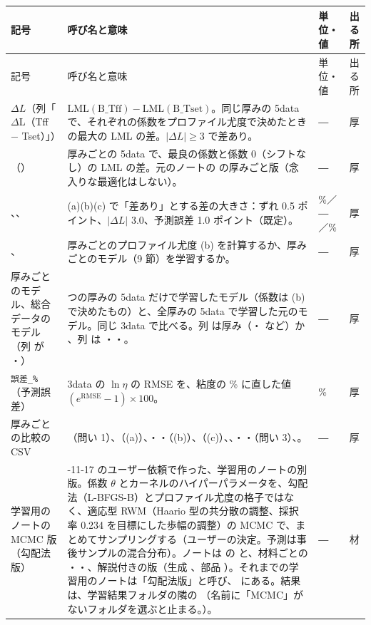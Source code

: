 \documentclass[paper=a4paper,fontsize=10.5pt,line_length=44zw,number_of_lines=38]{jlreq}
\makeatletter
\newcommand{\file}[1]{\texttt{\detokenize{#1}}}
\newenvironment{symtab}{%
  \begin{longtable}{@{}>{\raggedright\arraybackslash}p{6.5\zw}>{\raggedright\arraybackslash}p{22\zw}>{\raggedright\arraybackslash}p{6\zw}>{\raggedright\arraybackslash}p{4.5\zw}@{}}
  \toprule 記号 & 呼び名と意味 & 単位・値 & 出る所 \\ \midrule \endfirsthead
  \toprule 記号 & 呼び名と意味 & 単位・値 & 出る所 \\ \midrule \endhead
  \bottomrule \endlastfoot}{\end{longtable}}
\makeatother
\begin{document}
\begin{symtab}
$\Delta L$（列「$\Delta$L（Tff − Tset）」） & $\mathrm{LML}(\text{B\_Tff})-\mathrm{LML}(\text{B\_Tset})$。同じ厚みの 5data で、それぞれの係数をプロファイル尤度で決めたときの最大の LML の差。$|\Delta L|\ge3$ で差あり。 & ― & 厚 \\
\file{係数0との差}（\file{プロファイル尤度_厚みごと.csv}） & 厚みごとの 5data で、最良の係数と係数 0（シフトなし）の LML の差。元のノートの \file{dLML_vs_0} の厚みごと版（念入りな最適化はしない）。 & ― & 厚 \\
\file{A_CLEAR}、\file{DL_CLEAR}、\file{ERR_CLEAR} & (a)(b)(c) で「差あり」とする差の大きさ：ずれ 0.5 ポイント、$|\Delta L|$ 3.0、予測誤差 1.0 ポイント（既定）。 & \%／―／\% & 厚 \\
\file{THICK_PROFILE}、\file{THICK_MODELS} & 厚みごとのプロファイル尤度 (b) を計算するか、厚みごとのモデル（9 節）を学習するか。 & ― & 厚 \\
厚みごとのモデル、総合データのモデル（列 \file{学習} が \file{厚みごと}・\file{総合}） & 1 つの厚みの 5data だけで学習したモデル（係数は (b) で決めたもの）と、全厚みの 5data で学習した元のモデル。同じ 3data で比べる。列 \file{厚みの名前} は厚み（\file{0.5}・\file{1} など）か \file{全厚み}、列 \file{範囲} は \file{全体}・\file{低速側}・\file{高速側}。 & ― & 厚 \\
\texttt{誤差\_\%}（予測誤差） & 3data の $\ln\eta$ の RMSE を、粘度の \% に直した値 $(e^{\mathrm{RMSE}}-1)\times100$。 & \% & 厚 \\
厚みごとの比較の CSV & \file{温度シフトの確認_厚みごと.csv}（問い 1）、\file{重ね合わせ_厚みごと.csv}（(a)）、\file{プロファイル尤度_厚みごと.csv}・\file{…_格子_厚みごと.csv}・\file{対数周辺尤度の差_厚みごと.csv}（(b)）、\file{検証誤差_厚みごと.csv}（(c)）、\file{厚みごとの比較_まとめ.csv}、\file{厚みごとと総合の比較.csv}・\file{…_まとめ.csv}・\file{厚みごとのモデル_予測値.csv}（問い 3）、\file{判定の一覧.csv}。 & ― & 厚 \\
学習用のノートの MCMC 版（勾配法版） & 2026-11-17 のユーザー依頼で作った、学習用のノートの別版。係数 $\theta$ とカーネルのハイパーパラメータを、勾配法（L-BFGS-B）とプロファイル尤度の格子ではなく、適応型 RWM（Haario 型の共分散の調整、採択率 0.234 を目標にした歩幅の調整）の MCMC で、まとめてサンプリングする（ユーザーの決定。予測は事後サンプルの混合分布）。ノートは \file{02_材料別_温度シフト機械学習コード/02_MCMC(適応型RWM)/} の \file{材料別_温度シフトGPR_MCMC_ARD対応Matern52＋線形＋ホワイトノイズ.ipynb} と、材料ごとの \file{PP_}・\file{MIXPP_}・\file{GPPS_…}、解説付きの版（生成 \file{build_mat_shift_mcmc_nb.py}、部品 \file{mat_mcmc.py}）。それまでの学習用のノートは「勾配法版」と呼び、\file{01_勾配法（L-BFGS-B）/} にある。結果は、学習結果フォルダの隣の \file{<N回目>_<材料フォルダ>_学習結果_MCMC/}（名前に「MCMC」がないフォルダを選ぶと止まる。\file{REQUIRE_MCMC_FOLDER}）。 & ― & 材 \\

\end{symtab}
\end{document}

